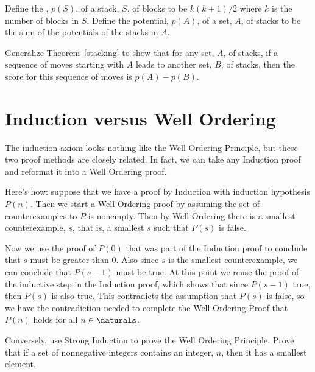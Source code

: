 \begin{notesproblem}

Define the , $p(S)$, of a stack, $S$, of blocks to be
$k(k+1)/2$ where $k$ is the number of blocks in $S$.  Define the
potential, $p(A)$, of a set, $A$, of stacks to be the sum of the
potentials of the stacks in $A$.

Generalize Theorem~\ref{stacking} to show that for any set, $A$, of
stacks, if a sequence of moves starting with $A$ leads to another set,
$B$, of stacks, then the score for this sequence of moves is $p(A)-p(B)$.
\end{notesproblem}



\section{Induction versus Well Ordering}\label{versusWO}

The induction axiom looks nothing like the Well Ordering Principle, but
these two proof methods are closely related.  In fact, we can take any
Induction proof and reformat it into a Well Ordering proof.

Here's how: suppose that we have a proof by Induction with induction
hypothesis $P(n)$.  Then we start a Well Ordering proof by assuming the
set of counterexamples to $P$ is nonempty.  Then by Well Ordering there is
a smallest counterexample, $s$, that is, a smallest $s$ such that $P(s)$
is false.

Now we use the proof of $P(0)$ that was part of the Induction proof to
conclude that $s$ must be greater than 0.  Also since $s$ is the smallest
counterexample, we can conclude that $P(s-1)$ must be true.  At this point
we reuse the proof of the inductive step in the Induction proof, which
shows that since $P(s-1)$ true, then $P(s)$ is also true.  This
contradicts the assumption that $P(s)$ is false, so we have the
contradiction needed to complete the Well Ordering Proof that $P(n)$ holds
for all $n \in \naturals$.

\begin{notesproblem}
  Conversely, use Strong Induction to prove the Well Ordering Principle.
  \hint Prove that if a set of nonnegative integers contains an integer,
  $n$, then it has a smallest element.
\end{notesproblem}

